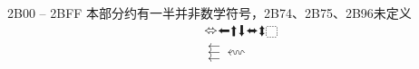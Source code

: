 \documentclass[twoside, 10pt]{article}
\begin{document}
        2B00 -- 2BFF 本部分约有一半并非数学符号，2B74、2B75、2B96未定义
        \begin{align}
            & ⬄ ⬅ ⬆ ⬇ ⬌ ⬍ ⬚ \\
            & ⬱ ⬳
        \end{align}
\end{document}
